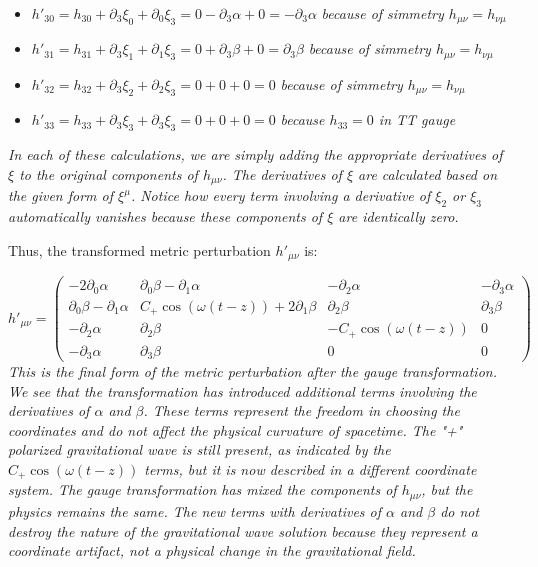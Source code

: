 \begin{itemize}
    \item $h'_{30} = h_{30} + \partial_3 \xi_0 + \partial_0 \xi_3 = 0 -\partial_3 \alpha + 0= -\partial_3 \alpha$ \emph{because of simmetry $h_{\mu\nu}=h_{\nu\mu}$}
    \item $h'_{31} = h_{31} + \partial_3 \xi_1 + \partial_1 \xi_3 = 0 + \partial_3 \beta + 0 = \partial_3 \beta$ \emph{because of simmetry $h_{\mu\nu}=h_{\nu\mu}$}
    \item $h'_{32} = h_{32} + \partial_3 \xi_2 + \partial_2 \xi_3 = 0 + 0 + 0 = 0$ \emph{because of simmetry $h_{\mu\nu}=h_{\nu\mu}$}
    \item $h'_{33} = h_{33} + \partial_3 \xi_3 + \partial_3 \xi_3 = 0 + 0 + 0 = 0$ \emph{because $h_{33}=0$ in TT gauge}
\end{itemize}
\emph{In each of these calculations, we are simply adding the appropriate derivatives of $\xi$ to the original components of $h_{\mu\nu}$. The derivatives of $\xi$ are calculated based on the given form of $\xi^{\mu}$. Notice how every term involving a derivative of $\xi_2$ or $\xi_3$ automatically vanishes because these components of $\xi$ are identically zero.}

Thus, the transformed metric perturbation $h'_{\mu \nu}$ is:

\begin{equation}
h'_{\mu \nu} = \begin{pmatrix}
-2\partial_0 \alpha & \partial_0 \beta - \partial_1 \alpha & -\partial_2 \alpha & -\partial_3 \alpha \\
\partial_0 \beta - \partial_1 \alpha & C_{+} \cos(\omega(t-z)) + 2\partial_1 \beta & \partial_2 \beta & \partial_3 \beta \\
-\partial_2 \alpha & \partial_2 \beta & -C_{+} \cos(\omega(t-z)) & 0 \\
-\partial_3 \alpha & \partial_3 \beta & 0 & 0
\end{pmatrix}
\end{equation}
\emph{This is the final form of the metric perturbation after the gauge transformation. We see that the transformation has introduced additional terms involving the derivatives of $\alpha$ and $\beta$. These terms represent the freedom in choosing the coordinates and do not affect the physical curvature of spacetime. The "+" polarized gravitational wave is still present, as indicated by the $C_{+} \cos(\omega(t-z))$ terms, but it is now described in a different coordinate system. The gauge transformation has mixed the components of $h_{\mu\nu}$, but the physics remains the same. The new terms with derivatives of $\alpha$ and $\beta$ do not destroy the nature of the gravitational wave solution because they represent a coordinate artifact, not a physical change in the gravitational field.}


